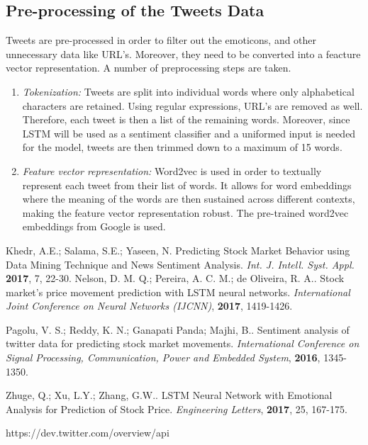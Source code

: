 \documentclass[conference]{IEEEtran}
\begin{document}
\subsection{Pre-processing of the Tweets Data}
\par Tweets are pre-processed in order to filter out the emoticons, and other unnecessary data like URL's. Moreover, they need to be converted into a feacture vector representation. A number of preprocessing steps are taken.
\begin{enumerate}
\item \textit{Tokenization:} Tweets are split into individual words where only alphabetical characters are retained. Using regular expressions, URL's are removed as well. Therefore, each tweet is then a list of the remaining words. Moreover, since LSTM will be used as a sentiment classifier and a uniformed input is needed for the model, tweets are then trimmed down to a maximum of 15 words.

\item \textit{Feature vector representation:} Word2vec is used in order to textually represent each tweet from their list of words. It allows for word embeddings where the meaning of the words are then sustained across different contexts, making the feature vector representation robust. The pre-trained word2vec embeddings from Google is used.
\end{enumerate}

\begin{thebibliography}{2}
 Khedr, A.E.; Salama, S.E.; Yaseen, N. Predicting Stock Market Behavior using Data Mining Technique and News Sentiment Analysis. \textit{Int. J. Intell. Syst. Appl.} \textbf{2017}, 7, 22-30.
 Nelson, D. M. Q.; Pereira, A. C. M.; de Oliveira, R. A.. Stock market’s price movement
prediction with LSTM neural networks. \textit{International Joint Conference on Neural Networks (IJCNN)}, \textbf{2017}, 1419-1426.

 Pagolu, V. S.; Reddy, K. N.; Ganapati Panda; Majhi, B.. Sentiment
analysis of twitter data for predicting stock market
movements. \textit{International
Conference on Signal Processing, Communication,
Power and Embedded System}, \textbf{2016}, 1345-1350.

 Zhuge, Q.; Xu, L.Y.; Zhang, G.W..  LSTM Neural Network with Emotional
Analysis for Prediction of Stock Price. \textit{Engineering Letters}, \textbf{2017}, 25, 167-175.

 https://dev.twitter.com/overview/api
\end{thebibliography}
\end{document}
